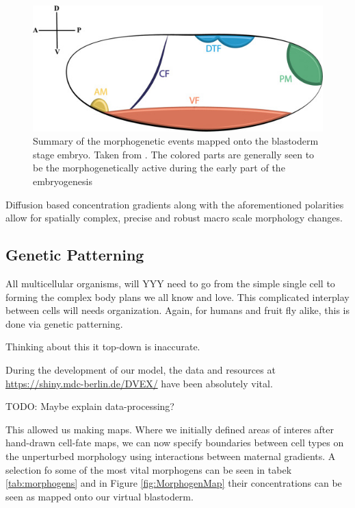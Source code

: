 \begin{figure}[H]
    \centering
    \includegraphics[width = 0.7\linewidth]{chapters/Theory/figures/morphogenic_events.jpg}
    \caption{Summary of the morphogenetic events mapped onto the blastoderm stage embryo. Taken from \cite{gheisari2020gastrulation}. The colored parts are generally seen to be the morphogenetically active during the early part of the embryogenesis}
    \label{fig:enter-label}
\end{figure}



Diffusion based concentration gradients along with the aforementioned polarities allow for spatially complex, precise and robust macro scale morphology changes.

\subsection{Genetic Patterning}
\label{sec:gen_patterns}
All multicellular organisms, will YYY need to go from the simple single cell to forming the complex body plans we all know and love. This complicated interplay between cells will needs organization. Again, for humans and fruit fly alike, this is done via genetic patterning.\cite{veraksa2000developmental}

Thinking about this it top-down is inaccurate.




During the development of our model, the data and resources at \url{https://shiny.mdc-berlin.de/DVEX/} have been absolutely vital.

TODO: Maybe explain data-processing?

This allowed us making maps. Where we initially defined areas of interes after hand-drawn cell-fate maps, we can now specify boundaries between cell types on the unperturbed morphology using interactions between maternal gradients. A selection fo some of the most vital morphogens can be seen in tabek \ref{tab:morphogens} and in Figure \ref{fig:MorphogenMap} their concentrations can be seen as mapped onto our virtual blastoderm.


